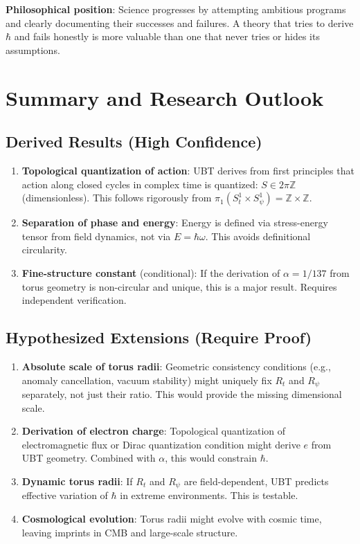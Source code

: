 \documentclass[12pt]{article}
\begin{document}
\textbf{Philosophical position}: Science progresses by attempting ambitious programs and clearly documenting their successes and failures. A theory that tries to derive $\hbar$ and fails honestly is more valuable than one that never tries or hides its assumptions.

\section{Summary and Research Outlook}

\subsection{Derived Results (High Confidence)}

\begin{enumerate}
\item \textbf{Topological quantization of action}: UBT derives from first principles that action along closed cycles in complex time is quantized: $S \in 2\pi \mathbb{Z}$ (dimensionless). This follows rigorously from $\pi_1(S^1_t \times S^1_\psi) = \mathbb{Z} \times \mathbb{Z}$.

\item \textbf{Separation of phase and energy}: Energy is defined via stress-energy tensor from field dynamics, not via $E = \hbar\omega$. This avoids definitional circularity.

\item \textbf{Fine-structure constant} (conditional): If the derivation of $\alpha = 1/137$ from torus geometry is non-circular and unique, this is a major result. Requires independent verification.
\end{enumerate}

\subsection{Hypothesized Extensions (Require Proof)}

\begin{enumerate}
\item \textbf{Absolute scale of torus radii}: Geometric consistency conditions (e.g., anomaly cancellation, vacuum stability) might uniquely fix $R_t$ and $R_\psi$ separately, not just their ratio. This would provide the missing dimensional scale.

\item \textbf{Derivation of electron charge}: Topological quantization of electromagnetic flux or Dirac quantization condition might derive $e$ from UBT geometry. Combined with $\alpha$, this would constrain $\hbar$.

\item \textbf{Dynamic torus radii}: If $R_t$ and $R_\psi$ are field-dependent, UBT predicts effective variation of $\hbar$ in extreme environments. This is testable.

\item \textbf{Cosmological evolution}: Torus radii might evolve with cosmic time, leaving imprints in CMB and large-scale structure.
\end{enumerate}
\end{document}
